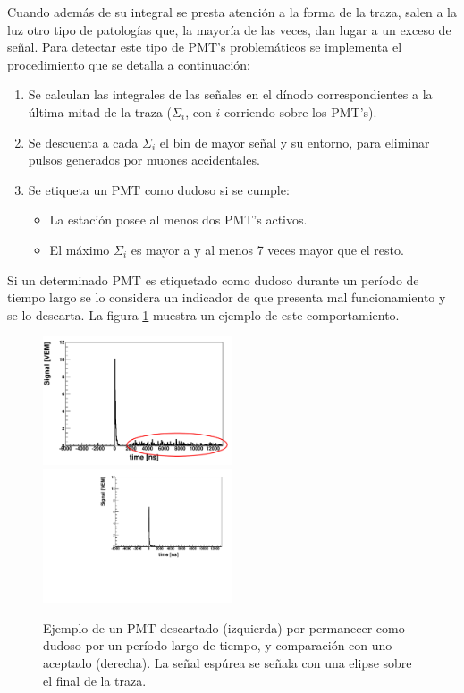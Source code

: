 		Cuando además de su integral se presta atención a la forma de la traza, salen a la luz otro tipo de patologías que, la mayoría de las veces, dan lugar a un exceso de señal.
		Para detectar este tipo de PMT's problemáticos se implementa el procedimiento que se detalla a continuación:
		\begin{enumerate}
		 \item Se calculan las integrales de las señales en el dínodo correspondientes a la última mitad de la traza ($\Sigma_i$, con $i$ corriendo sobre los PMT's).
		 \item Se descuenta a cada $\Sigma_i$ el bin de mayor señal y su entorno, para eliminar pulsos generados por muones accidentales.
		 \item Se etiqueta un PMT como dudoso si se cumple:
		 \begin{itemize}
		  \item La estación posee al menos dos PMT's activos.%
		  \item El máximo $\Sigma_i$ es mayor a  y al menos 7 veces mayor que el resto.
		 \end{itemize}
		\end{enumerate}
		
		Si un determinado PMT es etiquetado como dudoso durante un período de tiempo largo se lo considera un indicador de que presenta mal funcionamiento y se lo descarta.
		La figura \ref{fig:event3995196} muestra un ejemplo de este comportamiento. 
		\begin{figure}[h!]
			\includegraphics[width=0.5\textwidth]{fig/seleccionAuger/ev3995196_pmt2_anode_withEllipse.pdf}
			\includegraphics[width=0.5\textwidth]{fig/seleccionAuger/ev3995196_pmt3_anode.pdf}
			\caption{
			   Ejemplo de un PMT descartado (izquierda) por permanecer como dudoso por un período largo de tiempo, y comparación con uno aceptado (derecha). La señal espúrea se señala con una elipse sobre el final de la traza.
			}
			\label{fig:event3995196}
		\end{figure}

